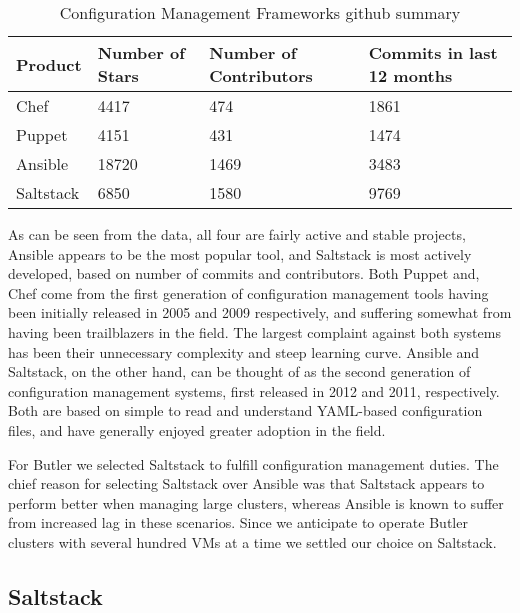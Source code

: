 \begin{table}[H]
\renewcommand{\arraystretch}{1.2} 
\centering
\caption{Configuration Management Frameworks github summary}
\label{tab:configuration_management}
\begin{tabu} to \linewidth{XX[,r]X[,r]X[,r]}
\toprule
Product & Number of Stars & Number of Contributors & Commits in last 12 months\\
\midrule
Chef & 4417 & 474 & 1861 \\
Puppet & 4151 & 431 & 1474\\
Ansible & 18720 & 1469 & 3483\\
Saltstack & 6850 & 1580 & 9769 \\
\bottomrule
\end{tabu}
\end{table}

As can be seen from the data, all four are fairly active and stable projects, Ansible appears to be the most popular tool, and Saltstack is most actively developed, based on number of commits and contributors. Both Puppet and, Chef come from the first generation of configuration management tools having been initially released in 2005 and 2009 respectively, and suffering somewhat from having been trailblazers in the field. The largest complaint against both systems has been their unnecessary complexity and steep learning curve. Ansible and Saltstack, on the other hand, can be thought of as the second generation of configuration management systems, first released in 2012 and 2011, respectively. Both are based on simple to read and understand YAML-based configuration files, and have generally enjoyed greater adoption in the field.

For Butler we selected Saltstack to fulfill configuration management duties. The chief reason for selecting Saltstack over Ansible was that Saltstack appears to perform better when managing large clusters, whereas Ansible is known to suffer from increased lag in these scenarios. Since we anticipate to operate Butler clusters with several hundred VMs at a time we settled our choice on Saltstack.

\subsection {Saltstack}


